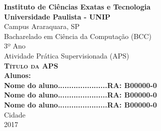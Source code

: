 \begin{titlepage}
  \centering
  \Large
  \textbf{Instituto de Ciências Exatas e Tecnologia \\ 
  			Universidade Paulista - UNIP}\\
  Campus Araraquara, SP\\[2em]
  
  Bacharelado em Ciência da Computação (BCC)\\
  3º Ano\\[7em]
  Atividade Prática Supervisionada (APS)\\
  \textsc{\textbf{\fontsize{17}{\baselineskip}\selectfont Título da APS}}\\[7em]

  
  \textbf{Alunos:}\\
  \textbf{\normalsize Nome do aluno......................RA: B00000-0}\\
  \textbf{\normalsize Nome do aluno......................RA: B00000-0}\\	
  \textbf{\normalsize Nome do aluno......................RA: B00000-0} \\[10em]
  
  Cidade\\ 2017
\end{titlepage}